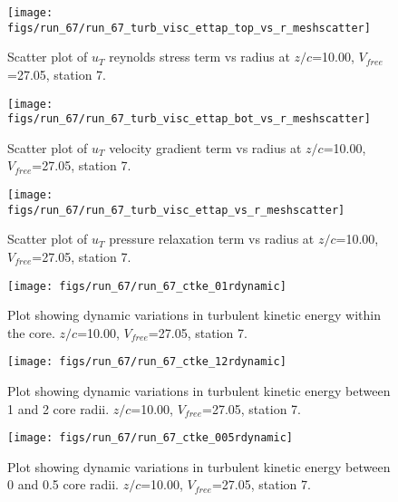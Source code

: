 \begin{figure}[H]
\centering
\texttt{[image: figs/run\_67/run\_67\_turb\_visc\_ettap\_top\_vs\_r\_meshscatter]}
\caption{Scatter plot of $
u_T$ reynolds stress term vs radius at $z/c$=10.00, $V_{free}$=27.05, station 7.}
\label{fig:run_67_turb_visc_ettap_top_vs_r_meshscatter}
\end{figure}


\begin{figure}[H]
\centering
\texttt{[image: figs/run\_67/run\_67\_turb\_visc\_ettap\_bot\_vs\_r\_meshscatter]}
\caption{Scatter plot of $
u_T$ velocity gradient term vs radius at $z/c$=10.00, $V_{free}$=27.05, station 7.}
\label{fig:run_67_turb_visc_ettap_bot_vs_r_meshscatter}
\end{figure}


\begin{figure}[H]
\centering
\texttt{[image: figs/run\_67/run\_67\_turb\_visc\_ettap\_vs\_r\_meshscatter]}
\caption{Scatter plot of $
u_T$ pressure relaxation term vs radius at $z/c$=10.00, $V_{free}$=27.05, station 7.}
\label{fig:run_67_turb_visc_ettap_vs_r_meshscatter}
\end{figure}


\begin{figure}[H]
\centering
\texttt{[image: figs/run\_67/run\_67\_ctke\_01rdynamic]}
\caption{Plot showing dynamic variations in turbulent kinetic energy within the core. $z/c$=10.00, $V_{free}$=27.05, station 7.}
\label{fig:run_67_ctke_01rdynamic}
\end{figure}


\begin{figure}[H]
\centering
\texttt{[image: figs/run\_67/run\_67\_ctke\_12rdynamic]}
\caption{Plot showing dynamic variations in turbulent kinetic energy between 1 and 2 core radii. $z/c$=10.00, $V_{free}$=27.05, station 7.}
\label{fig:run_67_ctke_12rdynamic}
\end{figure}


\begin{figure}[H]
\centering
\texttt{[image: figs/run\_67/run\_67\_ctke\_005rdynamic]}
\caption{Plot showing dynamic variations in turbulent kinetic energy between 0 and 0.5 core radii. $z/c$=10.00, $V_{free}$=27.05, station 7.}
\label{fig:run_67_ctke_005rdynamic}
\end{figure}


